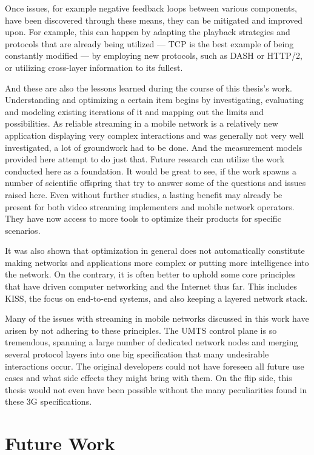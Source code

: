 Once issues, for example negative feedback loops between various components, have been discovered through these means, they can be mitigated and improved upon. For example, this can happen by adapting the playback strategies and protocols that are already being utilized --- \gls{TCP} is the best example of being constantly modified --- by employing new protocols, such as \gls{DASH} or \gls{HTTP}/2, or utilizing cross-layer information to its fullest.

And these are also the lessons learned during the course of this thesis's work. Understanding and optimizing a certain item begins by investigating, evaluating and modeling existing iterations of it and mapping out the limits and possibilities. As reliable streaming in a mobile network is a relatively new application displaying very complex interactions and was generally not very well investigated, a lot of groundwork had to be done. And the measurement models provided here attempt to do just that. Future research can utilize the work conducted here as a foundation. It would be great to see, if the work spawns a number of scientific offspring that try to answer some of the questions and issues raised here. Even without further studies, a lasting benefit may already be present for both video streaming implementers and mobile network operators. They have now access to more tools to optimize their products for specific scenarios.

It was also shown that optimization in general does not automatically constitute making networks and applications more complex or putting more intelligence into the network. On the contrary, it is often better to uphold some core principles that have driven computer networking and the Internet thus far. This includes \gls{KISS}, the focus on end-to-end systems, and also keeping a layered network stack. 

Many of the issues with streaming in mobile networks discussed in this work have arisen by not adhering to these principles. The \gls{UMTS} control plane is so tremendous, spanning a large number of dedicated network nodes and merging several protocol layers into one big specification that many undesirable interactions occur. The original developers could not have foreseen all future use cases and what side effects they might bring with them. On the flip side, this thesis would not even have been possible without the many peculiarities found in these \gls{3G} specifications.


\section{Future Work}

